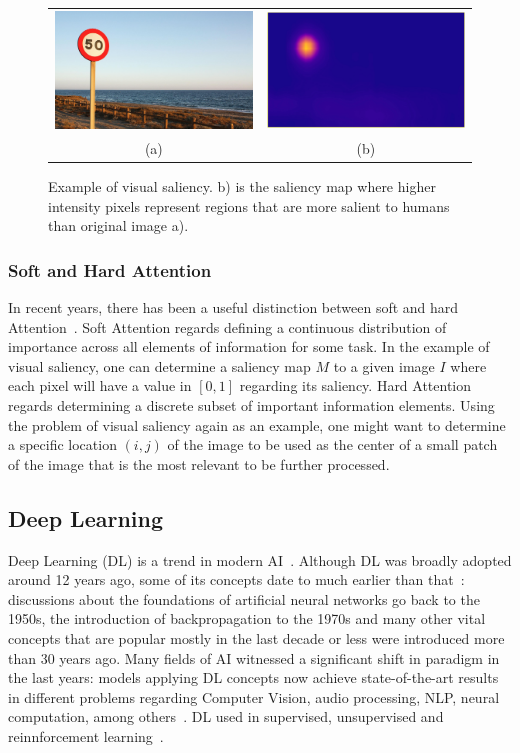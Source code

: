 \documentclass[12pt]{article}
\begin{document}
\begin{figure}[!htb]
\begin{center}
        \begin{tabular} {cc}
        \includegraphics[width=0.35\linewidth]{./img/traffic_sign_s.jpg} &
        \includegraphics[width=0.35\linewidth]{./img/traffic_sign_m.jpg}\\
        (a) & (b)
        \end{tabular}
\caption{Example of visual saliency.
    b) is the saliency map where higher intensity pixels represent
    regions that are more salient to humans than original image a).}
\label{fig:saliency}
\end{center}
\end{figure}

\subsubsection{Soft and Hard Attention}
In recent years, there has been a useful distinction between
soft and hard Attention~\cite{ref:att-survey}.
Soft Attention regards defining a continuous distribution of importance
across all elements of information for some task.
In the example of visual saliency, one can determine a saliency map $M$
to a given image $I$ where each pixel will have a value in $[0, 1]$
regarding its saliency.
Hard Attention regards determining a discrete subset of
important information elements.
Using the problem of visual saliency again as an example,
one might want to determine a specific location $(i, j)$ of the image
to be used as the center of a small patch of the image that is the most
relevant to be further processed.

\subsection{Deep Learning}
Deep Learning (DL) is a trend in modern AI~\cite{ref:dl}.
Although DL was broadly adopted around 12 years ago,
some of its concepts date to much earlier than that~\cite{ref:dl}:
discussions about the foundations of artificial neural networks go back
to the 1950s, the introduction of backpropagation to the 1970s
and many other vital concepts that are popular mostly in the last decade or less
were introduced more than 30 years ago.
Many fields of AI witnessed a significant shift in paradigm
in the last years: models applying DL concepts now achieve state-of-the-art results in different problems regarding Computer Vision,
audio processing, NLP, neural computation, among others~\cite{ref:dl-book}.
DL used in supervised, unsupervised and reinnforcement learning~\cite{ref:dl}.
\end{document}
